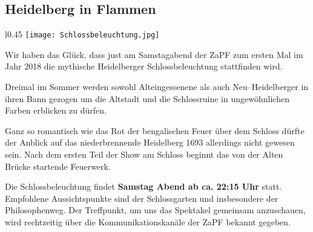 \subsection*{Heidelberg in Flammen} %

\begin{wrapfigure}{l}{0.45\textwidth}
\texttt{[image: Schlossbeleuchtung.jpg]}
\vspace*{-20pt}
\end{wrapfigure}
Wir haben das Glück, dass just am Samstagabend der ZaPF zum ersten Mal im Jahr 2018 die mythische Heidelberger Schlossbeleuchtung stattfinden wird.

Dreimal im Sommer werden sowohl Alteingessenene als auch Neu--Heidelberger in ihren Bann gezogen um die Altstadt und die Schlossruine in ungewöhnlichen Farben erblicken zu dürfen.

\hspace{-5.6cm} Ganz so romantisch wie das Rot der bengalischen Feuer über dem Schloss dürfte der Anblick auf das niederbrennende Heidelberg 1693 allerdings nicht gewesen sein. Nach dem ersten Teil der Show am Schloss beginnt das von der Alten Brücke startende Feuerwerk. 

Die Schlossbeleuchtung findet \textbf{Samstag Abend ab ca. 22:15 Uhr} statt. Empfohlene Aussichtspunkte sind der Schlossgarten und insbesondere der Philosophenweg. Der Treffpunkt, um uns das Spektakel gemeinsam anzuschauen, wird rechtzeitig über die Kommunikationskanäle der ZaPF bekannt gegeben.
